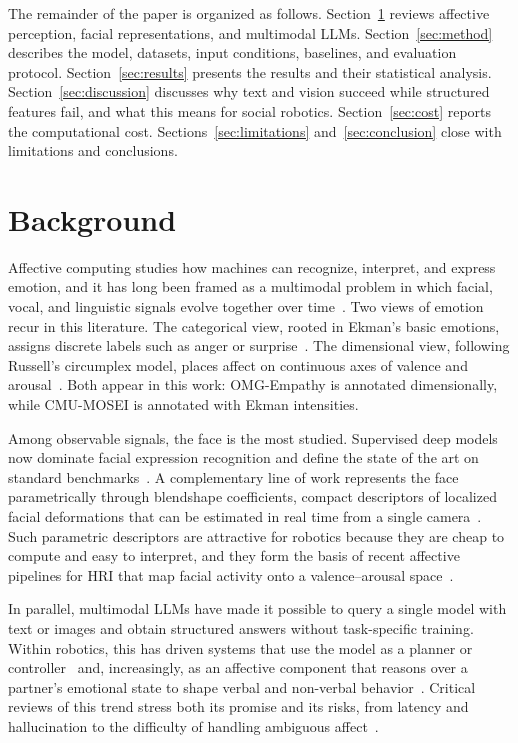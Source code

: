 \documentclass[conference]{IEEEtran}
\begin{document}
The remainder of the paper is organized as follows. Section~\ref{sec:background} reviews affective perception, facial representations, and multimodal LLMs. Section~\ref{sec:method} describes the model, datasets, input conditions, baselines, and evaluation protocol. Section~\ref{sec:results} presents the results and their statistical analysis. Section~\ref{sec:discussion} discusses why text and vision succeed while structured features fail, and what this means for social robotics. Section~\ref{sec:cost} reports the computational cost. Sections~\ref{sec:limitations} and~\ref{sec:conclusion} close with limitations and conclusions.

\section{Background}
\label{sec:background}
Affective computing studies how machines can recognize, interpret, and express emotion, and it has long been framed as a multimodal problem in which facial, vocal, and linguistic signals evolve together over time~\cite{Picard1997AffectiveComputing, Calvo2010AffectDetection}. Two views of emotion recur in this literature. The categorical view, rooted in Ekman's basic emotions, assigns discrete labels such as anger or surprise~\cite{Ekman1992BasicEmotions}. The dimensional view, following Russell's circumplex model, places affect on continuous axes of valence and arousal~\cite{Russell1980Circumplex}. Both appear in this work: OMG-Empathy is annotated dimensionally, while CMU-MOSEI is annotated with Ekman intensities.

Among observable signals, the face is the most studied. Supervised deep models now dominate facial expression recognition and define the state of the art on standard benchmarks~\cite{Li2022DeepFER}. A complementary line of work represents the face parametrically through blendshape coefficients, compact descriptors of localized facial deformations that can be estimated in real time from a single camera~\cite{Surdulescu2023Blendshapes}. Such parametric descriptors are attractive for robotics because they are cheap to compute and easy to interpret, and they form the basis of recent affective pipelines for HRI that map facial activity onto a valence--arousal space~\cite{Spitale2024AffectiveRobotics}.

In parallel, multimodal LLMs have made it possible to query a single model with text or images and obtain structured answers without task-specific training. Within robotics, this has driven systems that use the model as a planner or controller~\cite{Ahn2022SayCan, Zitkovich2023RT2, Kawaharazuka2024RobotLLMSurvey} and, increasingly, as an affective component that reasons over a partner's emotional state to shape verbal and non-verbal behavior~\cite{Magalhaes2024Nadine, Churamani2024EmpathicGrounding}. Critical reviews of this trend stress both its promise and its risks, from latency and hallucination to the difficulty of handling ambiguous affect~\cite{Laban2024LLMsHRI}.
\end{document}
